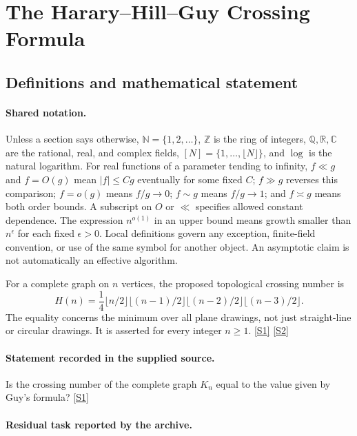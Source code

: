 \documentclass[11pt,a4paper]{article}
\newcommand{\N}{\mathbb{N}}
\newcommand{\Z}{\mathbb{Z}}
\newcommand{\Q}{\mathbb{Q}}
\newcommand{\R}{\mathbb{R}}
\newcommand{\C}{\mathbb{C}}
\newcommand{\sref}[2]{\hyperlink{source:#1:#2}{[S#2]}}
\begin{document}
\section{The Harary--Hill--Guy Crossing Formula}\label{statement}


\subsection{Definitions and mathematical statement}

\paragraph{Shared notation.}Unless a section says otherwise, $\N=\{1,2,\ldots\}$,
$\Z$ is the ring of integers, $\Q,\R,\C$ are the rational, real, and complex
fields, $[N]=\{1,\ldots,\lfloor N\rfloor\}$, and $\log$ is the natural
logarithm. For real functions of a parameter tending to infinity,
$f\ll g$ and $f=O(g)$ mean $|f|\leq Cg$ eventually for some fixed $C$;
$f\gg g$ reverses this comparison; $f=o(g)$ means $f/g\to0$;
$f\sim g$ means $f/g\to1$; and $f\asymp g$ means both order bounds.
A subscript on $O$ or $\ll$ specifies allowed constant dependence.
The expression $n^{o(1)}$ in an upper bound means growth smaller than
$n^\epsilon$ for each fixed $\epsilon>0$. Local definitions govern any
exception, finite-field convention, or use of the same symbol for another
object. An asymptotic claim is not automatically an effective algorithm.



For a complete graph on $n$ vertices, the proposed topological crossing number is
\[H(n)=\frac14\lfloor n/2\rfloor\lfloor(n-1)/2\rfloor\lfloor(n-2)/2\rfloor\lfloor(n-3)/2\rfloor.\]
The equality concerns the minimum over all plane drawings, not just straight-line or circular drawings. It is asserted for every integer $n\geq1$. \sref{statement}{1} \sref{statement}{2}

\paragraph{Statement recorded in the supplied source.}
Is the crossing number of the complete graph $K_n$ equal to the value given by Guy's formula? \sref{statement}{1}

\paragraph{Residual task reported by the archive.}
\end{document}
